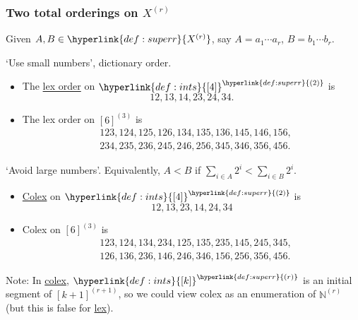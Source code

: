 \documentclass{article}
\newcommand{\named}[1]{\textbf{#1}\index{#1}}
\begin{document}
\subsubsection{Two total orderings on \texorpdfstring{$X^{(r)}$}{X(r)}}
Given $A,B \in \hyperlink{def:superr}{X^{(r)}}$, say $A = a_1 \dotsb a_r$, $B = b_1 \dotsb b_r$.
`Use small numbers', dictionary order.

\begin{eg}\leavevmode
  \begin{itemize}
    \item The \hyperlink{def:lex}{lex order} on $\hyperlink{def:ints}{[4]}^{\hyperlink{def:superr}{(2)}}$ is
      \begin{equation*}
        12,13,14,23,24,34.
      \end{equation*}
    \item The lex order on $[6]^{(3)}$ is
      \begin{align*}
        &123,124,125,126,134,135,136,145,146,156,\\
        &234,235,236,245,246,256,345,346,356,456.
      \end{align*}
  \end{itemize}
\end{eg}

`Avoid large numbers'. Equivalently, $A < B$ if $\sum_{i \in A} 2^i < \sum_{i \in B} 2^i$.
\begin{eg}\leavevmode
  \begin{itemize}
    \item \hyperlink{def:colex}{Colex} on $\hyperlink{def:ints}{[4]}^{\hyperlink{def:superr}{(2)}}$ is
      \begin{equation*}
        12,13,23,14,24,34
      \end{equation*}
    \item Colex on $[6]^{(3)}$ is
      \begin{align*}
        &123,124,134,234,125,135,235,145,245,345,\\
        &126,136,236,146,246,346,156,256,356,456.
      \end{align*}
  \end{itemize}
\end{eg}
Note: In \hyperlink{def:colex}{colex}, $\hyperlink{def:ints}{[k]}^{\hyperlink{def:superr}{(r)}}$ is an initial segment of $[k+1]^{(r+1)}$, so we could view colex as an enumeration of $\mathbb{N}^{(r)}$ (but this is false for \hyperlink{def:lex}{lex}).
\end{document}
